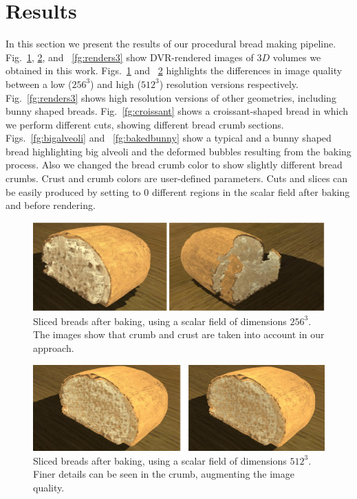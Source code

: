 \section{Results}
In this section we present the results of our procedural bread making pipeline.
Fig.~\ref{fg:renders}, \ref{fg:renders2}, and ~\ref{fg:renders3} show DVR-rendered images of $3D$ volumes we obtained in this work.
Figs.~\ref{fg:renders} and ~\ref{fg:renders2} highlights the differences in image quality between a low ($256^{3}$) and high  ($512^{3}$) resolution versions respectively. Fig.~\ref{fg:renders3} shows high resolution versions of other geometries, including bunny shaped breads.
Fig.~\ref{fg:croissant} shows a croissant-shaped bread in which we perform different cuts, showing different bread crumb sections.
Figs.~\ref{fg:bigalveoli} and ~\ref{fg:bakedbunny} show a typical and a bunny shaped bread highlighting big alveoli and the deformed bubbles resulting from the baking process.
Also we changed the bread crumb color to show slightly different bread crumbs.
Crust and crumb colors are user-defined parameters. 
Cuts and slices can be easily produced by setting to $0$ different regions in the scalar field after baking and before rendering.

\begin{figure}[!ht]
\begin{center}
\includegraphics[width=13cm]{figures/otherbread}
\caption{Sliced breads after baking, using a scalar field of dimensions $256^{3}$. The images show that crumb and crust are taken into account in our approach.}
\label{fg:renders}
\end{center}
\end{figure}

\begin{figure}[!ht]
\begin{center}
\includegraphics[width=13cm]{figures/otherbread512}
\caption{Sliced breads after baking, using a scalar field of dimensions $512^{3}$. Finer details can be seen in the crumb, augmenting the image quality.}
\label{fg:renders2}
\end{center}
\end{figure}

